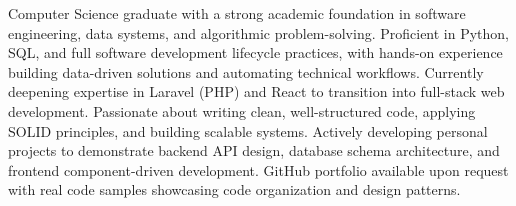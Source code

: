 

\begin{cvparagraph}

Computer Science graduate with a strong academic foundation in software engineering, data systems, and algorithmic problem-solving.
Proficient in Python, SQL, and full software development lifecycle practices, with hands-on experience building data-driven solutions and
automating technical workflows. Currently deepening expertise in Laravel (PHP) and React to transition into full-stack web development.
Passionate about writing clean, well-structured code, applying SOLID principles, and building scalable systems. Actively developing
personal projects to demonstrate backend API design, database schema architecture, and frontend component-driven development.
GitHub portfolio available upon request with real code samples showcasing code organization and design patterns.

\end{cvparagraph}

